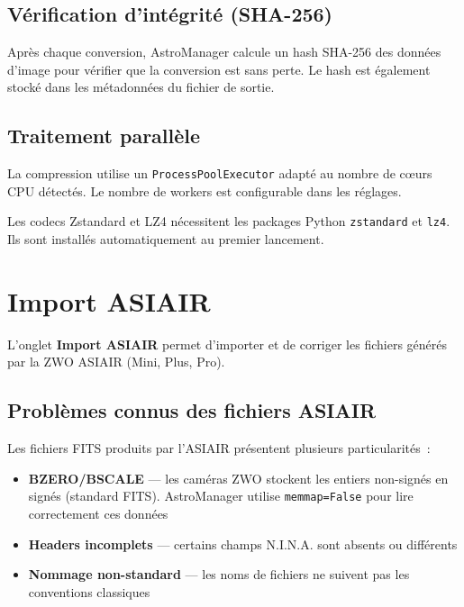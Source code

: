 \documentclass[a4paper,11pt]{article}
\begin{document}
\subsection{V\'{e}rification d'int\'{e}grit\'{e} (SHA-256)}

Apr\`{e}s chaque conversion, AstroManager calcule un hash SHA-256 des donn\'{e}es d'image pour v\'{e}rifier que la conversion est sans perte. Le hash est \'{e}galement stock\'{e} dans les m\'{e}tadonn\'{e}es du fichier de sortie.

\subsection{Traitement parall\`{e}le}

La compression utilise un \texttt{ProcessPoolExecutor} adapt\'{e} au nombre de c\oe{}urs CPU d\'{e}tect\'{e}s. Le nombre de workers est configurable dans les r\'{e}glages.

\begin{notebox}
Les codecs Zstandard et LZ4 n\'{e}cessitent les packages Python \texttt{zstandard} et \texttt{lz4}. Ils sont install\'{e}s automatiquement au premier lancement.
\end{notebox}


\section{Import ASIAIR}
\label{sec:asiair}

L'onglet \textbf{Import ASIAIR} permet d'importer et de corriger les fichiers g\'{e}n\'{e}r\'{e}s par la ZWO ASIAIR (Mini, Plus, Pro).

\subsection{Probl\`{e}mes connus des fichiers ASIAIR}

Les fichiers FITS produits par l'ASIAIR pr\'{e}sentent plusieurs particularit\'{e}s~:

\begin{itemize}
    \item \textbf{BZERO/BSCALE} --- les cam\'{e}ras ZWO stockent les entiers non-sign\'{e}s en sign\'{e}s (standard FITS). AstroManager utilise \texttt{memmap=False} pour lire correctement ces donn\'{e}es
    \item \textbf{Headers incomplets} --- certains champs N.I.N.A. sont absents ou diff\'{e}rents
    \item \textbf{Nommage non-standard} --- les noms de fichiers ne suivent pas les conventions classiques
\end{itemize}
\end{document}
